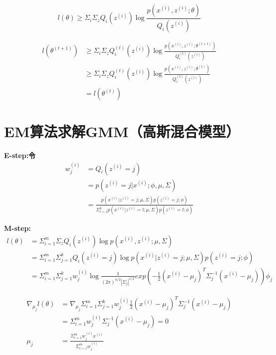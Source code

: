 \documentclass[a4paper,14pt]{report}
\begin{document}
\begin{equation}
l(\theta) \geq  \Sigma_{i}  \Sigma_{z}Q_{i}(z^{(i)}) \log \frac{p(x^{(i)},z^{(i)};\theta)}{Q_{i}(z^{(i)})} 
\end{equation}

\begin{equation}
\begin{split}
l(\theta^{(t+1)}) &\geq  \Sigma_{i}  \Sigma_{z}Q_{i}^{(t)}(z^{(i)}) \log \frac{p(x^{(i)},z^{(i)};\theta^{(t+1)})}{Q_{i}^{(t)}(z^{(i)})} \\
                  &\geq \Sigma_{i}  \Sigma_{z}Q_{i}^{(t)}(z^{(i)}) \log \frac{p(x^{(i)},z^{(i)};\theta^{(t)})}{Q_{i}^{(t)}(z^{(i)})} \\
                  &= l(\theta^{(t)})
\end{split}
\end{equation}

\section{EM算法求解GMM（高斯混合模型）}
\bf{E-step:}令
\begin{equation}
\begin{split}
    w_{j}^{(i)} &= Q_{i}(z^{(i)}=j) \\
                &= p(z^{(i)}=j|x^{(i)}; \phi , \mu , \Sigma )\\
                &= \frac{p(x^{(i)}|z^{(i)}=j; \mu , \Sigma ) p(z^{(i)}=j; \phi )}{ \Sigma _{l=1}^{k}p(x^{(i)}|z^{(i)}=l; \mu , \Sigma ) p(z^{(i)}=l; \phi )}
\end{split}
\end{equation}

\bf{M-step:}
\begin{equation}
\begin{split}
    l(\theta) &= \Sigma_{i=1}^{m}  \Sigma _{z}Q_{i}(z^{(i)}) \log p(x^{(i)},z^{(i)}; \mu , \Sigma ) \\
              &= \Sigma_{i=1}^{m}  \Sigma _{j=1}^{k}Q_{i}(z^{(i)}=j) \log p(x^{(i)}|z^{(i)}=j; \mu , \Sigma ) p(z^{(i)}=j; \phi ) \\
              &= \Sigma_{i=1}^{m}  \Sigma _{j=1}^{k}w^{(i)}_{j} \log \frac{1}{(2\pi)^{n/2}| \Sigma _j|^{1/2}}exp(-\frac{1}{2}(x^{(i)}-\mu_j)^T\Sigma_j^{-1}(x^{(i)}-\mu_j))\phi_j 
\end{split}
\end{equation}

\begin{equation}
    \begin{split}
         \nabla _{\mu_j}l(\theta) &= \nabla _{\mu_j} \Sigma_{i=1}^m  \Sigma_{j=1}^k w_j^{(i)}\frac{1}{2}(x^{(i)}-\mu_j)^T  \Sigma _j^{-1}(x^{(i)}-\mu_j) \\
                                  &=  \Sigma_{i=1}^m w_j^{(i)} \Sigma _j^{-1}(x^{(i)}-\mu_j) = 0\\
                            \mu_j &= \frac{\Sigma_{i=1}^m w_j^{(i)}x^{(i)}}{\Sigma_{i=1}^m w_j^{(i)}}
    \end{split}
\end{equation}
\end{document}
